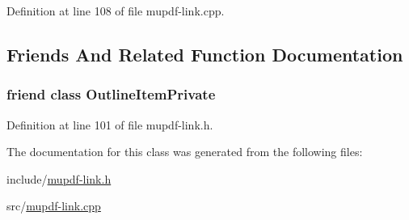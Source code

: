 Definition at line 108 of file mupdf-\/link.\-cpp.



\subsection{Friends And Related Function Documentation}
\hypertarget{class_mu_p_d_f_1_1_link_named_ab008ed670017e41b6e6bba8707c775d2}{
\subsubsection[{Outline\-Item\-Private}]{\setlength{\rightskip}{0pt plus 5cm}friend class Outline\-Item\-Private\hspace{0.3cm}{\ttfamily [friend]}}}\label{class_mu_p_d_f_1_1_link_named_ab008ed670017e41b6e6bba8707c775d2}


Definition at line 101 of file mupdf-\/link.\-h.



The documentation for this class was generated from the following files\-:\begin{DoxyCompactItemize}
\item 
include/\hyperlink{mupdf-link_8h}{mupdf-\/link.\-h}\item 
src/\hyperlink{mupdf-link_8cpp}{mupdf-\/link.\-cpp}\end{DoxyCompactItemize}
